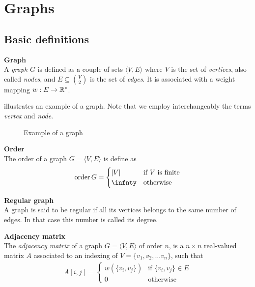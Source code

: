 \section{Graphs}

\subsection{Basic definitions}

\begin{definition}\textbf{Graph}\\
A \emph{graph} $G$ is defined as a couple of sets $\langle V,E \rangle$ where $V$ is the set of \emph{vertices}, also called \emph{nodes}, and $E \subseteq\binom{V}{2}$ is the set of \emph{edges}. It is associated with a weight mapping $w: E \rightarrow \mathbb{R}^*$.
\end{definition}

 illustrates an example of a graph. Note that we employ interchangeably the terms \emph{vertex} and \emph{node}.

\begin{figure}[H]
\centering
{}
\caption{Example of a graph}
\label{fig:graph}
\end{figure}

\begin{definition}\textbf{Order}\\
The order of a graph $G = \langle V,E \rangle$ is define as
\begin{gather*}
\order{G} = \begin{cases} |V| & \text{if $V$ is finite}\\ \infnty & \text{otherwise} \end{cases} 
\end{gather*}
\end{definition}

\begin{definition}\textbf{Regular graph}\\
A graph is said to be regular if all its vertices belongs to the same number of edges. In that case this number is called its degree.
\end{definition}

\begin{definition}\textbf{Adjacency matrix}\\
The \emph{adjacency matrix} of a graph $G = \langle V,E \rangle$ of order $n$, is a $n \times n$ real-valued matrix $A$ associated to an indexing of $V = \{v_1, v_2, \ldots v_n\}$, such that
\begin{gather*}
A[i,j] =
 \begin{cases}
   w\left(\{v_i,v_j\}\right) & \text{if } \{v_i,v_j\} \in E \\
   0 & \text{otherwise}
 \end{cases}
\end{gather*}
 \end{definition}

